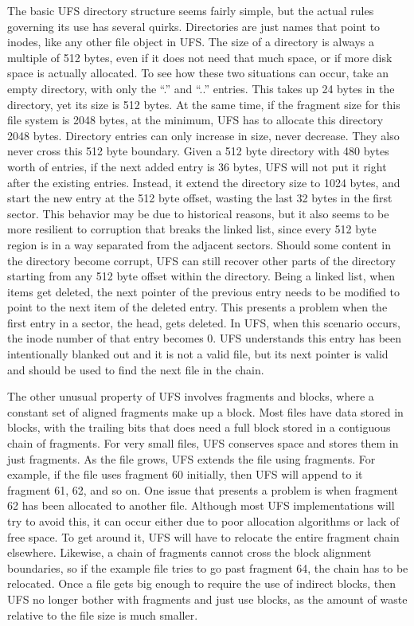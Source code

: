 The basic UFS directory structure seems fairly simple, but the actual rules
governing its use has several quirks. Directories are just names that point
to inodes, like any other file object in UFS. The size of a directory is
always a multiple of 512 bytes, even if it does not need that much space, or
if more disk space is actually allocated. To see how these two situations can
occur, take an empty directory, with only the ``.'' and ``..'' entries.
This takes up 24 bytes in the directory, yet its size is 512 bytes.
At the same time, if the fragment size for this file system is 2048 bytes, at
the minimum, UFS has to allocate this directory 2048 bytes. Directory entries
can only increase in size, never decrease. They also never cross this 512 byte
boundary. Given a 512 byte directory with 480 bytes worth of entries, if the
next added entry is 36 bytes, UFS will not put it right after the existing
entries. Instead, it extend the directory size to 1024 bytes, and start the new
entry at the 512 byte offset, wasting the last 32 bytes in the first sector.
This behavior may be due to historical reasons, but it also seems to be more
resilient to corruption that breaks the linked list, since every 512 byte
region is in a way separated from the adjacent sectors. Should some content in
the directory become corrupt, UFS can still recover other parts of the
directory starting from any 512 byte offset within the directory. Being a
linked list, when items get deleted, the next pointer of the previous entry
needs to be modified to point to the next item of the deleted entry. This
presents a problem when the first entry in a sector, the head, gets deleted.
In UFS, when this scenario occurs, the inode number of that entry becomes 0.
UFS understands this entry has been intentionally blanked out and it is not a
valid file, but its next pointer is valid and should be used to find the next
file in the chain.

The other unusual property of UFS involves fragments and blocks, where a
constant set of aligned fragments make up a block. Most files have data stored
in blocks, with the trailing bits that does need a full block stored in a
contiguous chain of fragments. For very small files, UFS conserves space and
stores them in just fragments. As the file grows, UFS extends the file using
fragments. For example, if the file uses fragment 60 initially, then UFS will
append to it fragment 61, 62, and so on. One issue that presents a problem is
when fragment 62 has been allocated to another file. Although most UFS
implementations will try to avoid this, it can occur either due to poor
allocation algorithms or lack of free space. To get around it, UFS will have
to relocate the entire fragment chain elsewhere. Likewise, a chain of fragments
cannot cross the block alignment boundaries, so if the example file tries to
go past fragment 64, the chain has to be relocated. Once a file gets big enough
to require the use of indirect blocks, then UFS no longer bother with
fragments and just use blocks, as the amount of waste relative to the file size
is much smaller.

